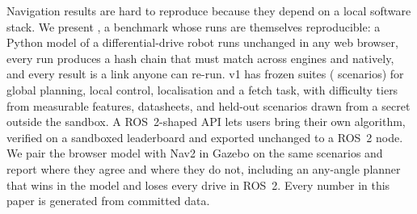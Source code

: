 Navigation results are hard to reproduce because they depend on a local software stack. We
present \bench{}, a benchmark whose runs are themselves reproducible: a Python model of a
differential-drive robot runs unchanged in any web browser, every run produces a hash chain that
must match across \DetEngines{} engines and natively, and every result is a link anyone can
re-run. \bench{} v1 has \BenchSuites{} frozen suites (\BenchScenarios{} scenarios) for global
planning, local control, localisation and a fetch task, with difficulty tiers from measurable
features, datasheets, and held-out scenarios drawn from a secret outside the sandbox. A
ROS~2-shaped API lets users bring their own algorithm, verified on a sandboxed leaderboard and
exported unchanged to a ROS~2 node. We pair the browser model with Nav2 in Gazebo on the same
scenarios and report where they agree and where they do not, including an any-angle planner
that wins in the model and loses every drive in ROS~2. Every number in this paper is generated
from committed data.
